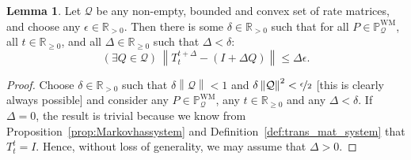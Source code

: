 \documentclass[10pt,a4paper]{paper}
\theoremstyle{definition}
\newtheorem{lemma}[theorem]{Lemma}
\newcommand{\reals}{\mathbb{R}}
\newcommand{\realspos}{\reals_{>0}}
\newcommand{\realsnonneg}{\reals_{\geq 0}}
\newcommand{\processes}{\mathbb{P}}
\newcommand{\wmprocesses}{\processes^{\mathrm{WM}}}
\newcommand{\rateset}{\mathcal{Q}}
\newcommand{\norm}[1]{\left\lVert #1 \right\rVert}
\begin{document}
\begin{lemma}\label{lemma:uniform_delta_for_convex_markov_set}
Let $\rateset$ be any non-empty, bounded and convex set of rate matrices, and choose any $\epsilon\in\realspos$. Then there is some $\delta\in\realspos$ such that for all $P\in\wmprocesses_\rateset$, all $t\in\realsnonneg$, and all $\Delta\in\realsnonneg$ such that $\Delta<\delta$:
\begin{equation*}
(\exists Q\in\rateset)\,\norm{T_{t}^{t+\Delta} - (I+\Delta Q)} \leq \Delta\epsilon.
\end{equation*}
\end{lemma}
\begin{proof}
Choose $\delta\in\realspos$ such that $\delta\norm{\rateset}<1$ and $\delta\norm{\rateset}^2<\nicefrac{\epsilon}{2}$ [this is clearly always possible] and consider any $P\in\wmprocesses_\rateset$, any $t\in\realsnonneg$ and any $\Delta<\delta$. If $\Delta=0$, the result is trivial because we know from Proposition~\ref{prop:Markovhassystem} and Definition~\ref{def:trans_mat_system} that $T_t^t=I$. Hence, without loss of generality, we may assume that $\Delta>0$.


\end{proof}
\end{document}
